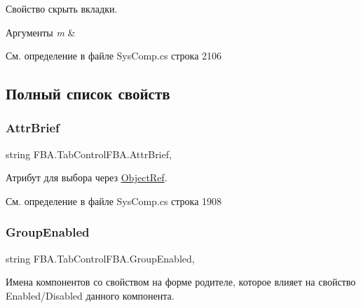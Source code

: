 Свойство скрыть вкладки. 


\begin{DoxyParams}{Аргументы}
{\em m} & \\
\hline
\end{DoxyParams}


См. определение в файле Sys\+Comp.\+cs строка 2106



\subsection{Полный список свойств}
\mbox{\label{class_f_b_a_1_1_tab_control_f_b_a_af603a870b359f259a5d0fba24f3bb3e2}} 
\subsubsection{\texorpdfstring{Attr\+Brief}{AttrBrief}}
{\footnotesize\ttfamily string F\+B\+A.\+Tab\+Control\+F\+B\+A.\+Attr\+Brief\hspace{0.3cm}{\ttfamily [get]}, {\ttfamily [set]}}



Атрибут для выбора через \mbox{\hyperlink{class_f_b_a_1_1_object_ref}{Object\+Ref}}. 



См. определение в файле Sys\+Comp.\+cs строка 1908

\mbox{\label{class_f_b_a_1_1_tab_control_f_b_a_a5e066f394c35e687e0959f35f7784dd5}} 
\subsubsection{\texorpdfstring{Group\+Enabled}{GroupEnabled}}
{\footnotesize\ttfamily string F\+B\+A.\+Tab\+Control\+F\+B\+A.\+Group\+Enabled\hspace{0.3cm}{\ttfamily [get]}, {\ttfamily [set]}}



Имена компонентов со свойством на форме родителе, которое влияет на свойство Enabled/\+Disabled данного компонента. 



